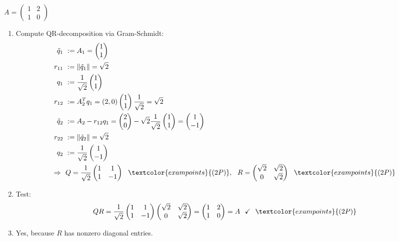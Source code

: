 {\color{solution}
$A=\begin{pmatrix}1&2\\1&0\end{pmatrix}$\begin{enumerate}
	\item Compute QR-decomposition via Gram-Schmidt:
	\begin{align*}
	\tilde{q}_1~&:=A_1 =\begin{pmatrix}1\\1\end{pmatrix}\\
	r_{11}~&:=\|\tilde{q}_1\|=\sqrt{2}\\
	q_1~&:=\frac{1}{\sqrt{2}}\begin{pmatrix}1\\1\end{pmatrix}\\
	r_{12}~&:=A_2^Tq_1 = (2,0)\begin{pmatrix}1\\1\end{pmatrix}\frac{1}{\sqrt{2}}=\sqrt{2}\\
	\tilde{q}_2~&:=A_2-r_{12}q_1=\begin{pmatrix}2\\0\end{pmatrix}-\sqrt{2}\frac{1}{\sqrt{2}}\begin{pmatrix}1\\1\end{pmatrix}=\begin{pmatrix}1\\-1\end{pmatrix}\\
	r_{22}~&:=\|\tilde{q}_2\|=\sqrt{2}\\
	q_2~&:=\frac{1}{\sqrt{2}}\begin{pmatrix}1\\-1\end{pmatrix}\\
	\Rightarrow~~&
	Q=\frac{1}{\sqrt{2}}\begin{pmatrix}1&1\\1&-1\end{pmatrix}~~\textcolor{exampoints}{(2P)},~~
	R=\begin{pmatrix}\sqrt{2}&\sqrt{2}\\0&\sqrt{2}\end{pmatrix}~~\textcolor{exampoints}{(2P)}
	\end{align*}
	\item 
	Test:
	$$
	QR=\frac{1}{\sqrt{2}}\begin{pmatrix}1&1\\1&-1\end{pmatrix}\begin{pmatrix}\sqrt{2}&\sqrt{2}\\0&\sqrt{2}\end{pmatrix}=\begin{pmatrix}1&2\\1&0\end{pmatrix}=A~~\checkmark~~\textcolor{exampoints}{(2P)}
	$$
	\item 
	Yes, because $R$ has nonzero diagonal entries.
\end{enumerate}
}